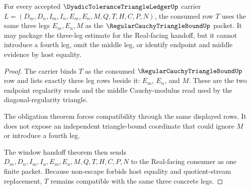 \begin{theorem}
\label{thm:dyadic-tolerance-triangle-ledger-triangle-bound-compatibility}
For every accepted $\DyadicToleranceTriangleLedgerUp$ carrier $L=(D_m,D_n,I_m,I_n,E_m,E_n,M,Q,T,H,C,P,N)$, the consumed row $T$ uses the same three legs $E_m,E_n,M$ as the $\RegularCauchyTriangleBoundUp$ packet. It may package the three-leg estimate for the Real-facing handoff, but it cannot introduce a fourth leg, omit the middle leg, or identify endpoint and middle evidence by host equality.
\end{theorem}
\begin{proof}
The carrier binds $T$ as the consumed $\RegularCauchyTriangleBoundUp$ row and lists exactly three leg rows beside it: $E_m$, $E_n$, and $M$. These are the two endpoint regularity reads and the middle Cauchy-modulus read used by the diagonal-regularity triangle.

The obligation theorem forces compatibility through the same displayed rows. It does not expose an independent triangle-bound coordinate that could ignore $M$ or introduce a fourth leg.

The window handoff theorem then sends $D_m,D_n,I_m,I_n,E_m,E_n,M,Q,T,H,C,P,N$ to the Real-facing consumer as one finite packet. Because non-escape forbids host equality and quotient-stream replacement, $T$ remains compatible with the same three concrete legs.
\end{proof}

